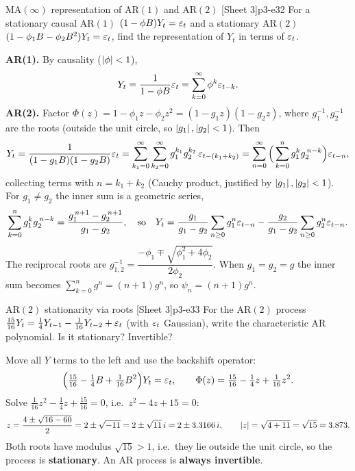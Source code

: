 \begin{exercise}{$\mathrm{MA}(\infty)$ representation of $\mathrm{AR}(1)$ and $\mathrm{AR}(2)$ \quad\textnormal{[Sheet 3]}}{p3-e32}
For a stationary causal $\mathrm{AR}(1)$ $(1-\phi B)Y_t=\varepsilon_t$ and a
stationary $\mathrm{AR}(2)$ $(1-\phi_1B-\phi_2B^2)Y_t=\varepsilon_t$, find the
representation of $Y_t$ in terms of $\varepsilon_t$.
\end{exercise}
\begin{solution}
\textbf{AR(1).} By causality ($\left\lvert \phi \right\rvert<1$),
\[
Y_t=\frac{1}{1-\phi B}\varepsilon_t=\sum_{k=0}^{\infty}\phi^{k}\varepsilon_{t-k}.
\]
\textbf{AR(2).} Factor $\Phi(z)=1-\phi_1 z-\phi_2 z^2=(1-g_1 z)(1-g_2 z)$, where
$g_1^{-1},g_2^{-1}$ are the roots (outside the unit circle, so
$\left\lvert g_1 \right\rvert,\left\lvert g_2 \right\rvert<1$). Then
\[
Y_t=\frac{1}{(1-g_1B)(1-g_2B)}\varepsilon_t
=\sum_{k_1=0}^{\infty}\sum_{k_2=0}^{\infty}g_1^{k_1}g_2^{k_2}\,\varepsilon_{t-(k_1+k_2)}
=\sum_{n=0}^{\infty}\Big(\sum_{k=0}^{n}g_1^{k}g_2^{\,n-k}\Big)\varepsilon_{t-n},
\]
collecting terms with $n=k_1+k_2$ (Cauchy product, justified by
$\left\lvert g_1 \right\rvert,\left\lvert g_2 \right\rvert<1$). For $g_1\ne g_2$ the inner sum is a geometric series,
\[
\sum_{k=0}^{n}g_1^{k}g_2^{\,n-k}=\frac{g_1^{\,n+1}-g_2^{\,n+1}}{g_1-g_2},
\quad\text{so}\quad
Y_t=\frac{g_1}{g_1-g_2}\sum_{n\ge0}g_1^{n}\varepsilon_{t-n}-\frac{g_2}{g_1-g_2}\sum_{n\ge0}g_2^{n}\varepsilon_{t-n}.
\]
The reciprocal roots are
$g_{1,2}^{-1}=\dfrac{-\phi_1\mp\sqrt{\phi_1^2+4\phi_2}}{2\phi_2}$. When
$g_1=g_2=g$ the inner sum becomes $\sum_{k=0}^n g^n=(n+1)g^{n}$, so
$\psi_n=(n+1)g^{n}$.
\end{solution}

\begin{exercise}{$\mathrm{AR}(2)$ stationarity via roots \quad\textnormal{[Sheet 3]}}{p3-e33}
For the $\mathrm{AR}(2)$ process
$\frac{15}{16}Y_t=\frac14 Y_{t-1}-\frac{1}{16}Y_{t-2}+\varepsilon_t$ (with $\varepsilon_t$
Gaussian), write the characteristic AR polynomial. Is it stationary? Invertible?
\end{exercise}
\begin{solution}
Move all $Y$ terms to the left and use the backshift operator:
\[
\Big(\tfrac{15}{16}-\tfrac14B+\tfrac{1}{16}B^2\Big)Y_t=\varepsilon_t,
\qquad
\Phi(z)=\tfrac{15}{16}-\tfrac14 z+\tfrac{1}{16}z^2 .
\]
Solve $\frac{1}{16}z^2-\frac14 z+\frac{15}{16}=0$, i.e.\ $z^2-4z+15=0$:
\[
z=\frac{4\pm\sqrt{16-60}}{2}=2\pm\sqrt{-11}=2\pm\sqrt{11}\,i
\approx 2\pm 3.3166\,i,
\qquad \left\lvert z \right\rvert=\sqrt{4+11}=\sqrt{15}\approx3.873 .
\]
Both roots have modulus $\sqrt{15}>1$, i.e.\ they lie outside the unit circle,
so the process is \textbf{stationary}. An $\mathrm{AR}$ process is
\textbf{always invertible}.
\end{solution}


